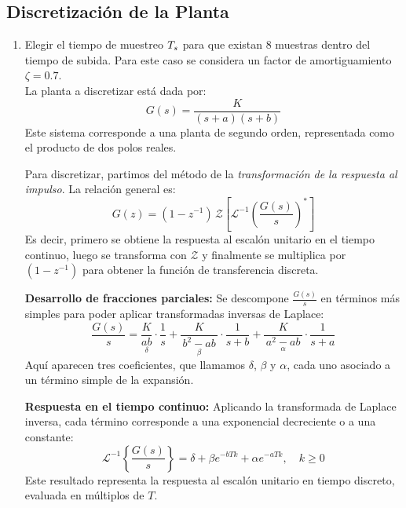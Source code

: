 \subsection{Discretización de la Planta}
\begin{enumerate}[label=2.\arabic*.]
	\item Elegir el tiempo de muestreo $T_s$ para que existan 8 muestras dentro del tiempo de subida. Para este caso se considera un factor de amortiguamiento $\zeta = 0.7$. \\
	
	La planta a discretizar está dada por:
	\begin{equation}
		G(s) = \frac{K}{(s+a)(s+b)}
	\end{equation}
	Este sistema corresponde a una planta de segundo orden, representada como el producto de dos polos reales.
	
	Para discretizar, partimos del método de la \emph{transformación de la respuesta al impulso}. La relación general es:
	\begin{equation}
		G(z)=(1 - z^{-1})\,\mathcal{Z}\left[\mathcal{L}^{-1}\left(\frac{G(s)}{s}\right)^*\right]
	\end{equation}
	Es decir, primero se obtiene la respuesta al escalón unitario en el tiempo continuo, luego se transforma con $\mathcal{Z}$ y finalmente se multiplica por $(1-z^{-1})$ para obtener la función de transferencia discreta.
	
	\vspace{0.5em}
	\textbf{Desarrollo de fracciones parciales:}  
	Se descompone $\tfrac{G(s)}{s}$ en términos más simples para poder aplicar transformadas inversas de Laplace:
	\begin{equation}
		\frac{G(s)}{s} =
		\underset{\delta}{\frac{K}{ab}} \cdot \frac{1}{s}
		+ \underset{\beta}{\frac{K}{\,b^2-ab\,}} \cdot \frac{1}{s+b}
		+ \underset{\alpha}{\frac{K}{\,a^2-ab\,}} \cdot \frac{1}{s+a}
	\end{equation}
	Aquí aparecen tres coeficientes, que llamamos $\delta$, $\beta$ y $\alpha$, cada uno asociado a un término simple de la expansión.
	
	\vspace{0.5em}
	\textbf{Respuesta en el tiempo continuo:}  
	Aplicando la transformada de Laplace inversa, cada término corresponde a una exponencial decreciente o a una constante:
	\begin{equation}
		\mathcal{L}^{-1} \left\{\frac{G(s)}{s}\right\}=\delta + \beta e^{-bTk}+\alpha e^{-aTk}, \quad k \geq 0
	\end{equation}
	Este resultado representa la respuesta al escalón unitario en tiempo discreto, evaluada en múltiplos de $T$.
	

\end{enumerate}
